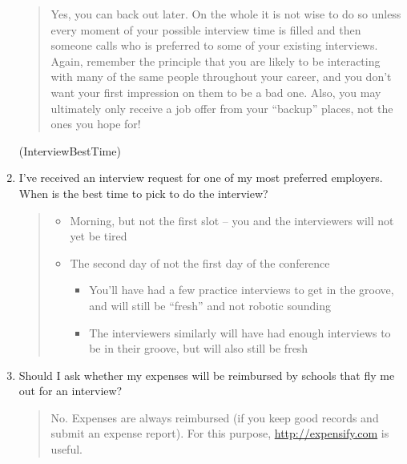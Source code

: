 \documentclass{\classes/econtex}
\providecommand\phantomsection{}
\begin{document}
\begin{enumerate}
  \begin{quote}
    Yes, you can back out later.  On the whole it is not wise to do so unless every moment of your possible interview time is filled and then someone calls who is preferred to some of your existing interviews.  Again, remember the principle that you are likely to be interacting with many of the same people throughout your career, and you don't want your first impression on them to be a bad one.  Also, you may ultimately only receive a job offer from your ``backup'' places, not the ones you hope for!

  \end{quote}
  \ifdvi\phantomsection\hypertarget{InterviewBestTime}{(InterviewBestTime)}\fi
  
\item  I've received an interview request for one of my most preferred employers. When is the best time to pick to do the interview?
  \begin{quote}
  \begin{itemize}
  \item Morning, but not the first slot -- you and the interviewers will not yet be tired
  \item The second day of not the first day of the conference
    \begin{itemize}
    \item You'll have had a few practice interviews to get in the groove, and will still be ``fresh'' and not robotic sounding
    \item The interviewers similarly will have had enough interviews to be in their groove, but will also still be fresh
    \end{itemize}
  \end{itemize}
  \end{quote}

\item  Should I ask whether my expenses will be reimbursed by schools that fly me out for an interview?
  \begin{quote}
    No.  Expenses are always reimbursed (if you keep good records and submit an expense report).  For this purpose, \url{http://expensify.com} is useful.

  \end{quote}


\end{enumerate}
\end{document}
